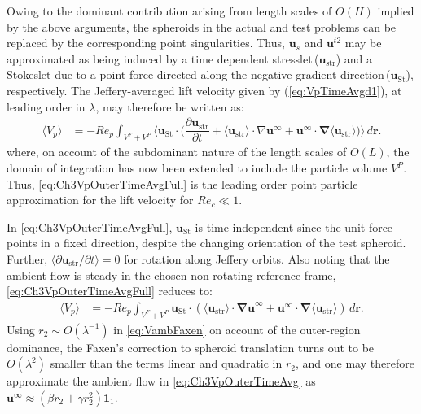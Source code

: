 \documentclass{jfm}
\begin{document}
Owing to the dominant contribution arising from length scales of $O(H)$ implied by the above arguments, the spheroids in the actual and test problems can be replaced by the corresponding point singularities. Thus, $\bm{u}_s$ and $\bm{u}^{t2}$ may be approximated as being induced by a time dependent stresslet\,($\bm{u}_\text{str}$) and a Stokeslet due to a point force directed along the negative gradient direction\,($\bm{u}_\text{St}$), respectively. The Jeffery-averaged lift velocity given by (\ref{eq:VpTimeAvgd1}), at leading order in $\lambda$, may therefore be written as:
\begin{align}
\langle V_p\rangle &=-Re_p\int_{V^F+V^P}\Big\langle\bm{u}_\text{St}\cdot\Big(\dfrac{\partial\bm{u}_\text{str}}{\partial t}+ \langle\bm{u}_\text{str}\rangle \cdot\nabla\bm{u}^\infty+\bm{u}^\infty\cdot\bm{\nabla}\langle \bm{u}_\text{str}\rangle\Big)\Big\rangle\,d\bm{r}. \label{eq:Ch3VpOuterTimeAvgFull}
\end{align}
where, on account of the subdominant nature of the length scales of $O(L)$, the domain of integration has now been extended to include the particle volume $V^P$. Thus, \eqref{eq:Ch3VpOuterTimeAvgFull} is the leading order point particle approximation for the lift velocity for $Re_c\ll1$. 

  In \eqref{eq:Ch3VpOuterTimeAvgFull}, $\bm{u}_\text{St}$ is time independent since the unit force points in a fixed direction, despite the changing orientation of the test spheroid. Further,  $\langle\partial\bm{u}_\text{str}/\partial t\rangle=0$ for rotation along Jeffery orbits. Also noting that the ambient flow is steady in the chosen non-rotating reference frame, \eqref{eq:Ch3VpOuterTimeAvgFull} reduces to:
\begin{align}
\langle V_p\rangle &=-Re_p\int_{V^F+V^P}\bm{u}_\text{St}\cdot(\langle\bm{u}_\text{str}\rangle\cdot\bm{\nabla u}^\infty+\bm{u}^\infty\cdot\bm{\nabla}\langle \bm{u}_\text{str}\rangle)\,d\bm{r}. \label{eq:Ch3VpOuterTimeAvg}
\end{align}
Using $r_2 \sim O(\lambda^{-1})$ in \eqref{eq:VambFaxen} on account of the outer-region dominance, the Faxen's correction to spheroid translation turns out to be $O(\lambda^2)$ smaller than the terms linear and quadratic in $r_2$, and one may therefore approximate the ambient flow   in \eqref{eq:Ch3VpOuterTimeAvg} as $\bm{u}^\infty\approx(\beta r_2 +\gamma r_2^2)\bm{1}_1$. 
\end{document}
